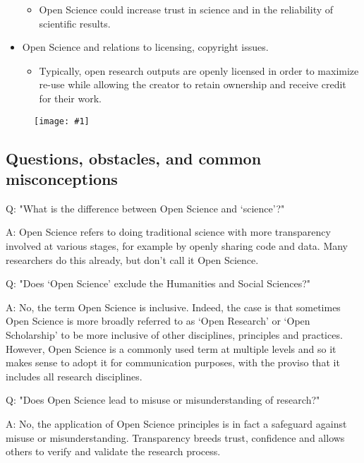 \documentclass{article}
\newlength{\imgwidth}
\newcommand\scaledgraphics[2]{%
                
\settowidth{\imgwidth}{\texttt{[image: \#1]}}%
                
\setlength{\imgwidth}{\minof{\imgwidth}{#2\textwidth}}%
                
\texttt{[image: \#1]}%
                
}
\begin{document}
\begin{itemize}
\begin{itemize}
\item Open Science could increase trust in science and in the reliability of scientific results.


\end{itemize}

\item Open Science and relations to licensing, copyright issues.

\begin{itemize}
\item Typically, open research outputs are openly licensed in order to maximize re-use while allowing the creator to retain ownership and receive credit for their work.


\end{itemize}

\end{itemize}
\begin{figure}
\scaledgraphics{2b202773-ec41-4cde-8558-44800112ec6d.png}{1}
\label{F60452071}
\end{figure}


\subsection{Questions, obstacles, and common misconceptions}\label{questions-obstacles-and-common-misconceptions}



Q: "What is the difference between Open Science and ‘science’?"


A: Open Science refers to doing traditional science with more transparency involved at various stages, for example by openly sharing code and data. Many researchers do this already, but don’t call it Open Science.


Q: "Does ‘Open Science’ exclude the Humanities and Social Sciences?"


A: No, the term Open Science is inclusive. Indeed, the case is that sometimes Open Science is more broadly referred to as ‘Open Research’ or ‘Open Scholarship’ to be more inclusive of other disciplines, principles and practices. However, Open Science is a commonly used term at multiple levels and so it makes sense to adopt it for communication purposes, with the proviso that it includes all research disciplines.


Q: "Does Open Science lead to misuse or misunderstanding of research?"


A: No, the application of Open Science principles is in fact a safeguard against misuse or misunderstanding. Transparency breeds trust, confidence and allows others to verify and validate the research process.
\end{document}
